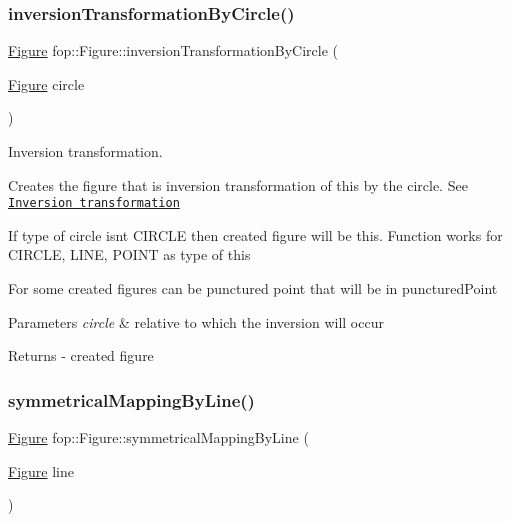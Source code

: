 \subsubsection{\texorpdfstring{inversion\+Transformation\+By\+Circle()}{inversionTransformationByCircle()}}
{\footnotesize\ttfamily \mbox{\hyperlink{classfop_1_1_figure}{Figure}} fop\+::\+Figure\+::inversion\+Transformation\+By\+Circle (\begin{DoxyParamCaption}\item[{\mbox{\hyperlink{classfop_1_1_figure}{Figure}}}]{circle }\end{DoxyParamCaption})}



Inversion transformation. 

Creates the figure that is inversion transformation of \textquotesingle{}this\textquotesingle{} by the \textquotesingle{}circle\textquotesingle{}. See \href{https://en.wikipedia.org/wiki/Inversion_transformation}{\tt Inversion transformation}

If type of \textquotesingle{}circle\textquotesingle{} isn\textquotesingle{}t C\+I\+R\+C\+LE then created figure will be \textquotesingle{}this\textquotesingle{}. Function works for C\+I\+R\+C\+LE, L\+I\+NE, P\+O\+I\+NT as type of \textquotesingle{}this\textquotesingle{}

For some created figures can be punctured point that will be in \textquotesingle{}punctured\+Point\textquotesingle{}


\begin{DoxyParams}{Parameters}
{\em circle} & relative to which the inversion will occur \\
\hline
\end{DoxyParams}
\begin{DoxyReturn}{Returns}
-\/ created figure 
\end{DoxyReturn}
\mbox{\label{classfop_1_1_figure_a7f1666507e49eb3c2a79dc33ae49eb90}} 
\subsubsection{\texorpdfstring{symmetrical\+Mapping\+By\+Line()}{symmetricalMappingByLine()}}
{\footnotesize\ttfamily \mbox{\hyperlink{classfop_1_1_figure}{Figure}} fop\+::\+Figure\+::symmetrical\+Mapping\+By\+Line (\begin{DoxyParamCaption}\item[{\mbox{\hyperlink{classfop_1_1_figure}{Figure}}}]{line }\end{DoxyParamCaption})}



